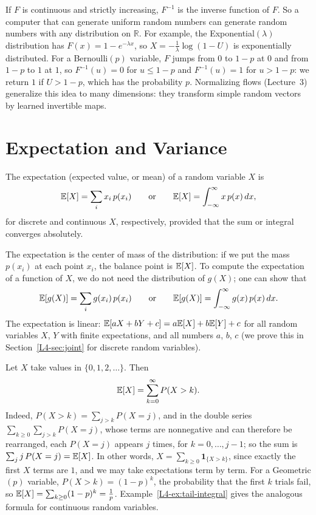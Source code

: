 If $F$ is continuous and strictly increasing, $F^{-1}$ is the inverse function of $F$. So a computer that can generate uniform random numbers can generate random numbers with any distribution on $\mathbb{R}$. For example, the Exponential$(\lambda)$ distribution has $F(x) = 1 - e^{-\lambda x}$, so $X = -\frac{1}{\lambda}\log(1 - U)$ is exponentially distributed. For a Bernoulli$(p)$ variable, $F$ jumps from $0$ to $1 - p$ at $0$ and from $1 - p$ to $1$ at $1$, so $F^{-1}(u) = 0$ for $u \leq 1 - p$ and $F^{-1}(u) = 1$ for $u > 1 - p$: we return $1$ if $U > 1 - p$, which has the probability $p$. Normalizing flows (Lecture~3) generalize this idea to many dimensions: they transform simple random vectors by learned invertible maps.

\section{Expectation and Variance}\label{L4-sec:expectation}

\begin{definition}[Expectation]\label{L4-def:expectation}
    The expectation (expected value, or mean) of a random variable $X$ is
    \[\mathbb{E}[X] = \sum_i x_i\,p(x_i) \qquad \text{or} \qquad \mathbb{E}[X] = \int_{-\infty}^\infty x\,p(x) \, dx,\]
    for discrete and continuous $X$, respectively, provided that the sum or integral converges absolutely.
\end{definition}

The expectation is the center of mass of the distribution: if we put the mass $p(x_i)$ at each point $x_i$, the balance point is $\mathbb{E}[X]$. To compute the expectation of a function of $X$, we do not need the distribution of $g(X)$; one can show that
\[\mathbb{E}[g(X)] = \sum_i g(x_i)\,p(x_i) \qquad \text{or} \qquad \mathbb{E}[g(X)] = \int_{-\infty}^\infty g(x)\,p(x) \, dx.\]
The expectation is linear: $\mathbb{E}[aX + bY + c] = a\mathbb{E}[X] + b\mathbb{E}[Y] + c$ for all random variables $X$, $Y$ with finite expectations, and all numbers $a$, $b$, $c$ (we prove this in Section~\ref{L4-sec:joint} for discrete random variables).

\begin{example}\label{L4-ex:tail-sum}
    Let $X$ take values in $\{0, 1, 2, \ldots\}$. Then
    \[\mathbb{E}[X] = \sum_{k=0}^\infty P(X > k).\]
    Indeed, $P(X > k) = \sum_{j > k} P(X = j)$, and in the double series $\sum_{k \geq 0}\sum_{j > k} P(X = j)$, whose terms are nonnegative and can therefore be rearranged, each $P(X = j)$ appears $j$ times, for $k = 0, \ldots, j - 1$; so the sum is $\sum_j j\,P(X = j) = \mathbb{E}[X]$. In other words, $X = \sum_{k \geq 0}\mathbf{1}_{\{X > k\}}$, since exactly the first $X$ terms are $1$, and we may take expectations term by term. For a Geometric$(p)$ variable, $P(X > k) = (1 - p)^k$, the probability that the first $k$ trials fail, so $\mathbb{E}[X] = \sum_{k \geq 0}(1 - p)^k = \frac{1}{p}$. Example~\ref{L4-ex:tail-integral} gives the analogous formula for continuous random variables.
\end{example}

